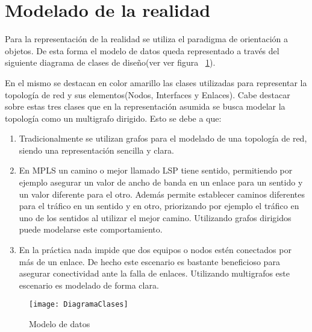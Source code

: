 
\section[Modelado de la realidad]{Modelado de la realidad}

Para la representaci\'on de la realidad se utiliza el paradigma de orientaci\'on a objetos. De esta forma el modelo de datos queda representado a través del siguiente diagrama de clases de diseño(ver ver figura ~\ref{fig:ModeloDeDatos}).

En el mismo se destacan en color amarillo las clases utilizadas para representar la topolog\'ia de red y sus elementos(Nodos, Interfaces y Enlaces). Cabe destacar sobre estas tres clases que en la representaci\'on asumida se busca modelar la topolog\'ia como un multigrafo dirigido. Esto se debe a que:

\begin{enumerate}
\item Tradicionalmente se utilizan grafos para el modelado de una topolog\'ia de red, siendo una representaci\'on sencilla y clara.

\item En MPLS un camino o mejor llamado LSP tiene sentido, permitiendo por ejemplo asegurar un valor de ancho de banda en un enlace para un sentido y un valor diferente para el otro. Adem\'as permite establecer caminos diferentes para el tr\'afico en un sentido y en otro, priorizando por ejemplo el tr\'afico  en uno de los sentidos al utilizar el mejor camino. Utilizando grafos dirigidos puede modelarse este comportamiento.

\item En la pr\'actica nada impide que dos equipos o nodos est\'en conectados por m\'as de un enlace. De hecho este escenario es bastante beneficioso para asegurar conectividad ante la falla de enlaces. Utilizando multigrafos este escenario es modelado de forma clara.
  
\end{enumerate}

\begin{figure}[ht!] 
\centering    
\texttt{[image: DiagramaClases]}
\caption[Modelo de datos]{Modelo de datos}
\label{fig:ModeloDeDatos}
\end{figure}

